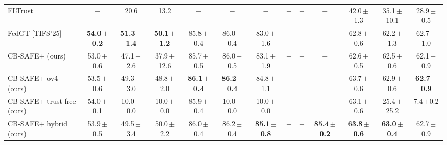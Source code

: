 \begin{table}[t]
\begin{tabular}{@{}lcccccccccccc@{}}
FLTrust & $-$ & 20.6 & 13.2 & $-$ & $-$ & $-$ & $-$ & $-$ & $-$ & 42.0\,{\scriptsize$\pm$1.3} & 35.1\,{\scriptsize$\pm$10.1} & 28.9\,{\scriptsize$\pm$0.5}\\
FedGT [TIFS'25] & \textbf{54.0\,{\scriptsize$\pm$0.2}} & \textbf{51.3\,{\scriptsize$\pm$1.4}} & \textbf{50.1\,{\scriptsize$\pm$1.2}} & 85.8\,{\scriptsize$\pm$0.4} & 86.0\,{\scriptsize$\pm$0.4} & 83.0\,{\scriptsize$\pm$1.6} & $-$ & $-$ & $-$ & 62.8\,{\scriptsize$\pm$0.6} & 62.2\,{\scriptsize$\pm$1.3} & 62.7\,{\scriptsize$\pm$1.0}\\
CB-SAFE+ (ours) & 53.0\,{\scriptsize$\pm$0.6} & 47.1\,{\scriptsize$\pm$2.6} & 37.9\,{\scriptsize$\pm$12.6} & 85.7\,{\scriptsize$\pm$0.5} & 86.0\,{\scriptsize$\pm$0.5} & 83.1\,{\scriptsize$\pm$1.9} & $-$ & $-$ & $-$ & 62.6\,{\scriptsize$\pm$0.5} & 62.5\,{\scriptsize$\pm$0.6} & 62.1\,{\scriptsize$\pm$0.9}\\
CB-SAFE+ ov4 (ours) & 53.5\,{\scriptsize$\pm$0.6} & 49.3\,{\scriptsize$\pm$3.0} & 48.8\,{\scriptsize$\pm$2.0} & \textbf{86.1\,{\scriptsize$\pm$0.4}} & \textbf{86.2\,{\scriptsize$\pm$0.4}} & 84.8\,{\scriptsize$\pm$1.1} & $-$ & $-$ & $-$ & 63.7\,{\scriptsize$\pm$0.6} & 62.9\,{\scriptsize$\pm$0.6} & \textbf{62.7\,{\scriptsize$\pm$0.9}}\\
CB-SAFE+ trust-free (ours) & 54.0\,{\scriptsize$\pm$0.1} & 10.0\,{\scriptsize$\pm$0.0} & 10.0\,{\scriptsize$\pm$0.0} & 85.9\,{\scriptsize$\pm$0.4} & 10.0\,{\scriptsize$\pm$0.0} & 10.0\,{\scriptsize$\pm$0.0} & $-$ & $-$ & $-$ & 63.1\,{\scriptsize$\pm$0.6} & 25.4\,{\scriptsize$\pm$25.2} & 7.4\,{\scriptsize$\pm$0.2}\\
CB-SAFE+ hybrid (ours) & 53.9\,{\scriptsize$\pm$0.5} & 49.5\,{\scriptsize$\pm$3.4} & 50.0\,{\scriptsize$\pm$2.2} & 86.0\,{\scriptsize$\pm$0.4} & 86.2\,{\scriptsize$\pm$0.4} & \textbf{85.1\,{\scriptsize$\pm$0.8}} & $-$ & $-$ & \textbf{85.4\,{\scriptsize$\pm$0.2}} & \textbf{63.8\,{\scriptsize$\pm$0.6}} & \textbf{63.0\,{\scriptsize$\pm$0.4}} & 62.7\,{\scriptsize$\pm$0.9}\\
\bottomrule\end{tabular}\end{table}